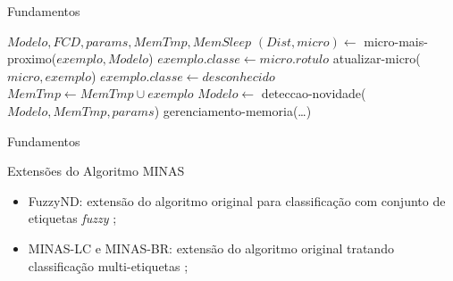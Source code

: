 \documentclass[aspectratio=43,10pt]{beamer}
\begin{document}
\begin{frame}[fragile]{Fundamentos}
  \begin{algorithm}[H]
    \caption{MINAS, trecho de classificação}
    \label{alg:MINAS}
    \renewcommand{\algorithmicrequire}{\textbf{Entrada:}}
    \begin{algorithmic}[1]
      \REQUIRE $Modelo,FCD,params,MemTmp,MemSleep$
      \STATE $(Dist,micro) \leftarrow$ micro-mais-proximo($exemplo,Modelo$)
      \STATE $exemplo.classe \leftarrow micro.rotulo$
      \STATE atualizar-micro($micro,exemplo$)
      \ELSE
      \STATE $exemplo.classe \leftarrow desconhecido$
      \STATE $MemTmp \leftarrow MemTmp \cup exemplo$
      \STATE $Modelo \leftarrow $ deteccao-novidade($Modelo,MemTmp,params$)
      \ENDIF
      \ENDIF
      \STATE gerenciamento-memoria(\dots)
      \ENDFOR
    \end{algorithmic}
  \end{algorithm}
\end{frame}

\begin{frame}[fragile]{Fundamentos}
  \begin{alertblock}{Extensões do Algoritmo MINAS}
    \begin{itemize}
      \item FuzzyND: extensão do algoritmo original para classificação com
      conjunto de etiquetas \emph{fuzzy} \cite{DaSilva2018,DaSilva2018thesis};
      \item MINAS-LC e MINAS-BR: extensão do algoritmo original tratando
      classificação multi-etiquetas \cite{Costa2019,Costa2019thesis};
    \end{itemize}
  \end{alertblock}
\end{frame}
\end{document}
